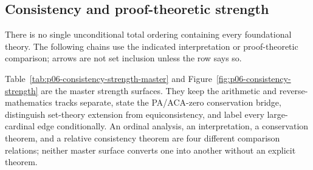 \subsection{Consistency and proof-theoretic strength}
\label{sec:p14-strength-table}

There is no single unconditional total ordering containing every foundational
theory. The following chains use the indicated interpretation or proof-theoretic
comparison; arrows are not set inclusion unless the row says so.

Table~\ref{tab:p06-consistency-strength-master} and
Figure~\ref{fig:p06-consistency-strength} are the master strength surfaces.
They keep the arithmetic and reverse-mathematics tracks separate, state the
PA/ACA-zero conservation bridge, distinguish set-theory extension from
equiconsistency, and label every large-cardinal edge conditionally.  An ordinal
analysis, an interpretation, a conservation theorem, and a relative
consistency theorem are four different comparison relations; neither master
surface converts one into another without an explicit theorem.

